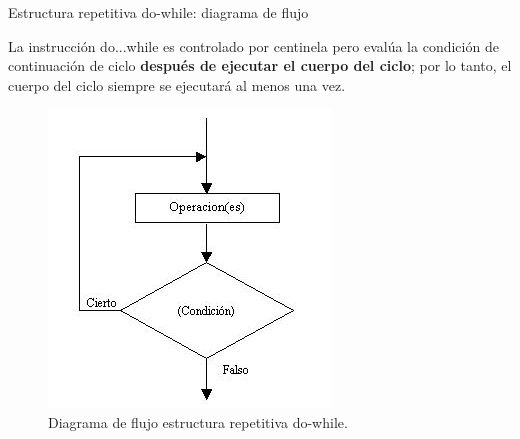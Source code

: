 \documentclass[xcolor=pdftex,table,11pt]{beamer}
\begin{document}
\begin{frame}{Estructura repetitiva do-while: diagrama de flujo}
\begin{block}{}
La instrucción do...while es controlado por centinela pero evalúa la condición de continuación de ciclo \textbf{después de ejecutar el cuerpo del ciclo}; por lo tanto, el cuerpo del ciclo siempre se ejecutará al menos una vez.
\end{block}


\begin{figure}
 \centering
\includegraphics[scale=0.5]{../img/exported/do_while.jpg}
\caption{Diagrama de flujo estructura repetitiva do-while.}
\end{figure}

\end{frame}

\begin{frame}
\codesetstylefrombeamer
{}
\end{frame}
\end{document}
